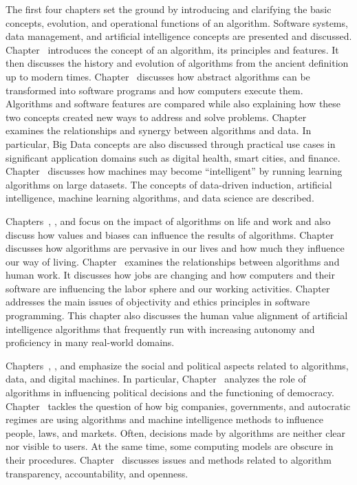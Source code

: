 The first four chapters set the ground by introducing and clarifying the basic concepts, evolution, and operational functions of an algorithm. Software systems, data management, and artificial intelligence concepts are presented and discussed. Chapter~ introduces the concept of an algorithm, its principles and features. It then discusses the history and evolution of algorithms from the ancient definition up to modern times. Chapter~ discusses how abstract algorithms can be transformed into software programs and how computers execute them. Algorithms and software features are compared while also explaining how these two concepts created new ways to address and solve problems. Chapter~ examines the relationships and synergy between algorithms and data. In particular, Big Data concepts are also discussed through practical use cases in significant application domains such as digital health, smart cities, and finance. Chapter~ discusses how machines may become ``intelligent'' by running learning algorithms on large datasets. The concepts of data-driven induction, artificial intelligence, machine learning algorithms, and data science are described.

Chapters~, , and  focus on the impact of algorithms on life and work and also discuss how values and biases can influence the results of algorithms. Chapter~ discusses how algorithms are pervasive in our lives and how much they influence our way of living. Chapter~ examines the relationships between algorithms and human work. It discusses how jobs are changing and how computers and their software are influencing the labor sphere and our working activities. Chapter~ addresses the main issues of objectivity and ethics principles in software programming. This chapter also discusses the human value alignment of artificial intelligence algorithms that frequently run with increasing autonomy and proficiency in many real-world domains.

Chapters~, , and  emphasize the social and political aspects related to algorithms, data, and digital machines. In particular, Chapter~ analyzes the role of algorithms in influencing political decisions and the functioning of democracy. Chapter~ tackles the question of how big companies, governments, and autocratic regimes are using algorithms and machine intelligence methods to influence people, laws, and markets. Often, decisions made by algorithms are neither clear nor visible to users. At the same time, some computing models are obscure in their procedures. Chapter~ discusses issues and methods related to algorithm transparency, accountability, and openness.

